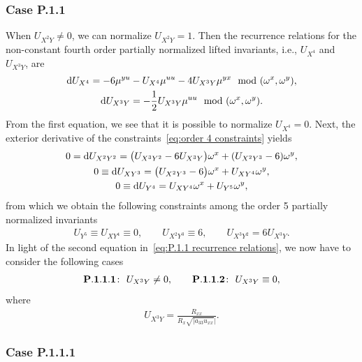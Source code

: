 \documentclass[pdftex]{sigma}%
\numberwithin{equation}{section}
\begin{document}
\subsubsection{Case P.1.1}

When $U_{X^2Y}\neq 0$, we can normalize $U_{X^2Y}=1$. Then the recurrence relations for the non-constant fourth order partially normalized lifted invariants, i.e., $U_{X^4}$ and $U_{X^3Y}$, are
\begin{gather}
{\rm d}U_{X^4} = - 6\mu^{yu} - U_{X^4}\mu^{uu}-4U_{X^3Y}\mu^{yx}\mod(\omega^x,\omega^y),\nonumber
\\
%
{\rm d}U_{X^3Y} = -\frac{1}{2}U_{X^3Y}\mu^{uu}
 \mod(\omega^x,\omega^y).
\label{eq:P.1.1 recurrence relations}
\end{gather}
%
From the first equation, we see that it is possible to normalize $U_{X^4}=0$. Next, the exterior derivative of the constraints~\eqref{eq:order 4 constraints} yields
%
\begin{gather*}
0 = {\rm d}U_{X^2Y^2} = \big(U_{X^3Y^2}-6U_{X^3Y}\big)\omega^x+(U_{X^2Y^3}-6)\omega^y,\\
0 \equiv {\rm d}U_{XY^3} = \big(U_{X^2Y^3}-6\big)\omega^x + U_{XY^4}\omega^y,\\
0 \equiv {\rm d}U_{Y^4} = U_{XY^4}\omega^x + U_{Y^5}\omega^y,
\end{gather*}
%
from which we obtain the following constraints among the order 5 partially normalized invariants
%
\begin{gather}\label{eq:P.1.1 constraints}
U_{Y^5}\equiv U_{XY^4} \equiv 0,\qquad U_{X^2Y^3}\equiv 6,\qquad U_{X^3Y^2} = 6U_{X^3Y}.
\end{gather}
%
In light of the second equation in~\eqref{eq:P.1.1 recurrence relations}, we now have to consider the following cases
\begin{gather*}
{\bf P.1.1.1}\colon\ U_{X^3Y}\neq 0,\qquad
{\bf P.1.1.2}\colon\ U_{X^3Y}\equiv 0,
\end{gather*}
where
\begin{gather*}
U_{X^3Y} = \frac{R_{xx}}{R_x \sqrt{|a_{33}u_{xx}}|}.
\end{gather*}


\subsubsection{Case P.1.1.1}
\end{document}
